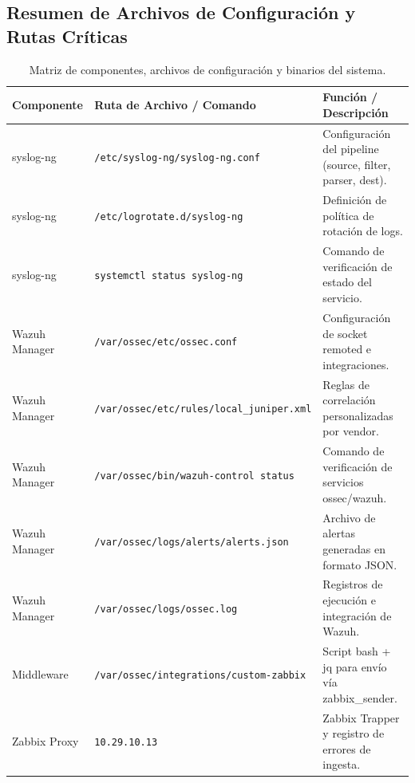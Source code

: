 \subsection{Resumen de Archivos de Configuración y Rutas Críticas}

\begin{longtable}{p{} p{} p{}}
\caption{Matriz de componentes, archivos de configuración y binarios del sistema.} \label{tab:matriz_componentes} \\
\toprule
\textbf{Componente} & \textbf{Ruta de Archivo / Comando} & \textbf{Función / Descripción} \\
\midrule
\endhead
\bottomrule
\endfoot
syslog-ng & \texttt{/etc/syslog-ng/syslog-ng.conf} & Configuración del pipeline (source, filter, parser, dest). \\
syslog-ng & \texttt{/etc/logrotate.d/syslog-ng} & Definición de política de rotación de logs. \\
syslog-ng & \texttt{systemctl status syslog-ng} & Comando de verificación de estado del servicio. \\
\midrule
Wazuh Manager & \texttt{/var/ossec/etc/ossec.conf} & Configuración de socket remoted e integraciones. \\
Wazuh Manager & \texttt{/var/ossec/etc/rules/local\_juniper.xml} & Reglas de correlación personalizadas por vendor. \\
Wazuh Manager & \texttt{/var/ossec/bin/wazuh-control status} & Comando de verificación de servicios ossec/wazuh. \\
Wazuh Manager & \texttt{/var/ossec/logs/alerts/alerts.json} & Archivo de alertas generadas en formato JSON. \\
Wazuh Manager & \texttt{/var/ossec/logs/ossec.log} & Registros de ejecución e integración de Wazuh. \\
\midrule
Middleware & \texttt{/var/ossec/integrations/custom-zabbix} & Script bash + jq para envío vía zabbix\_sender. \\
\midrule
Zabbix Proxy & \texttt{10.29.10.13} & Zabbix Trapper y registro de errores de ingesta. \\
\end{longtable}